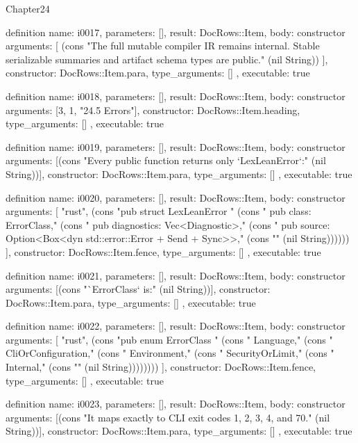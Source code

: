 \begin{lexlean}{Chapter24}
\begin{semanticmodule}
definition{
  name: i0017,
  parameters: [],
  result: DocRows::Item,
  body: constructor{
    arguments: [
      (cons "The full mutable compiler IR remains internal. Stable serializable summaries and artifact schema types are public." (nil String))
    ],
    constructor: DocRows::Item.para,
    type_arguments: []
  },
  executable: true
}

definition{
  name: i0018,
  parameters: [],
  result: DocRows::Item,
  body: constructor{
    arguments: [3, 1, "24.5 Errors"],
    constructor: DocRows::Item.heading,
    type_arguments: []
  },
  executable: true
}

definition{
  name: i0019,
  parameters: [],
  result: DocRows::Item,
  body: constructor{
    arguments: [(cons "Every public function returns only `LexLeanError`:" (nil String))],
    constructor: DocRows::Item.para,
    type_arguments: []
  },
  executable: true
}

definition{
  name: i0020,
  parameters: [],
  result: DocRows::Item,
  body: constructor{
    arguments: [
      "rust",
      (cons "pub struct LexLeanError {" (cons "    pub class: ErrorClass," (cons "    pub diagnostics: Vec<Diagnostic>," (cons "    pub source: Option<Box<dyn std::error::Error + Send + Sync>>," (cons "}" (nil String))))))
    ],
    constructor: DocRows::Item.fence,
    type_arguments: []
  },
  executable: true
}

definition{
  name: i0021,
  parameters: [],
  result: DocRows::Item,
  body: constructor{
    arguments: [(cons "`ErrorClass` is:" (nil String))],
    constructor: DocRows::Item.para,
    type_arguments: []
  },
  executable: true
}

definition{
  name: i0022,
  parameters: [],
  result: DocRows::Item,
  body: constructor{
    arguments: [
      "rust",
      (cons "pub enum ErrorClass {" (cons "    Language," (cons "    CliOrConfiguration," (cons "    Environment," (cons "    SecurityOrLimit," (cons "    Internal," (cons "}" (nil String))))))))
    ],
    constructor: DocRows::Item.fence,
    type_arguments: []
  },
  executable: true
}

definition{
  name: i0023,
  parameters: [],
  result: DocRows::Item,
  body: constructor{
    arguments: [(cons "It maps exactly to CLI exit codes 1, 2, 3, 4, and 70." (nil String))],
    constructor: DocRows::Item.para,
    type_arguments: []
  },
  executable: true
}


\end{semanticmodule}
\end{lexlean}
